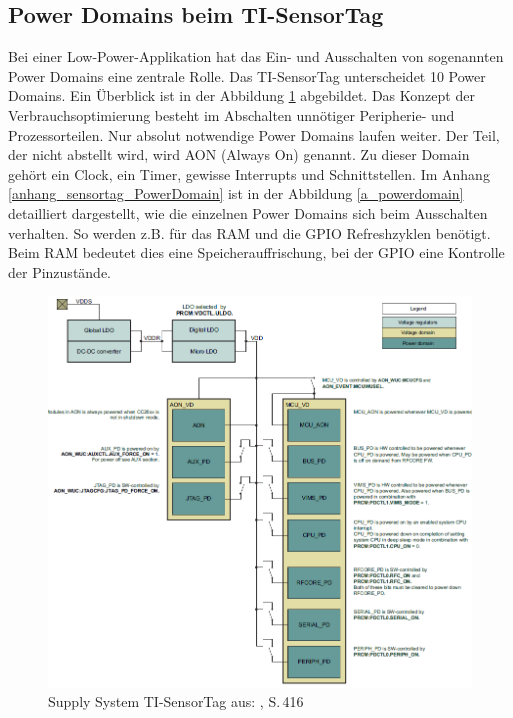 \subsection{Power Domains beim TI-SensorTag}
\label{PowerDomains}

Bei einer Low-Power-Applikation hat das Ein- und Ausschalten von sogenannten Power Domains eine zentrale Rolle. Das TI-SensorTag unterscheidet 10 Power Domains. Ein Überblick  ist in der Abbildung  \ref{supply_syst} abgebildet. Das Konzept der Verbrauchsoptimierung besteht im Abschalten unnötiger Peripherie- und Prozessorteilen. Nur absolut notwendige Power Domains laufen weiter. Der Teil, der nicht abstellt wird, wird AON (Always On) genannt. Zu dieser Domain gehört ein Clock, ein Timer, gewisse Interrupts und Schnittstellen. Im Anhang \ref{anhang_sensortag_PowerDomain} ist in der Abbildung \ref{a_powerdomain} detailliert dargestellt, wie die einzelnen Power Domains sich beim Ausschalten verhalten. So werden z.B. für das RAM und die GPIO Refreshzyklen benötigt. Beim RAM bedeutet dies eine Speicherauffrischung, bei der GPIO eine Kontrolle der Pinzustände.

\clearpage
\begin{figure}[ht]
  \includegraphics[width=1.0\textwidth]{3Vorgehen/imag/powerdomain_1.png}
  \caption{Supply System TI-SensorTag aus: \cite{Sensortag_Manual}, S.\,416}
  \label{supply_syst}
\end{figure}


